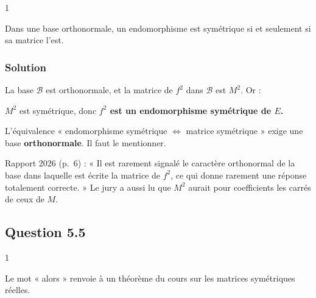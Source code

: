 \documentclass[11pt,a4paper]{article}
\newcommand{\equationajustee}[1]{%
  \sbox{\boiteequation}{$\displaystyle #1$}%
  \ifdim\wd\boiteequation>\linewidth
    \[\resizebox{\linewidth}{!}{\usebox{\boiteequation}}\]%
  \else
    \[#1\]%
  \fi}
\begin{document}
\begin{indication}{1}

Dans une base orthonormale, un endomorphisme est symétrique si et seulement si sa matrice l'est.

\end{indication}

\hypertarget{solution-7}{%
\subsubsection{Solution}\label{solution-7}}

La base \(\mathscr B\) est orthonormale, et la matrice de \(f^2\) dans \(\mathscr B\) est \(M^2\). Or :

\equationajustee{\begin{aligned}
(M^2)^\top&=(MM)^\top\\
&=M^\top M^\top\\
&=(-M)(-M)\\
&=M^2.
\end{aligned}}

\(M^2\) est symétrique, donc \textbf{\(f^2\) est un endomorphisme symétrique de \(E\).}

\begin{piege}

L'équivalence « endomorphisme symétrique \(\iff\) matrice symétrique » exige une base \textbf{orthonormale}. Il faut le mentionner.

\end{piege}

\begin{jury}

Rapport 2026 (p.~6) : « Il est rarement signalé le caractère orthonormal de la base dans laquelle est écrite la matrice de \(f^2\), ce qui donne rarement une réponse totalement correcte. » Le jury a aussi lu que \(M^2\) aurait pour coefficients les carrés de ceux de \(M\).

\end{jury}

\hypertarget{question-5.5}{%
\subsection{Question 5.5}\label{question-5.5}}

\begin{indication}{1}

Le mot « alors » renvoie à un théorème du cours sur les matrices symétriques réelles.

\end{indication}
\end{document}
